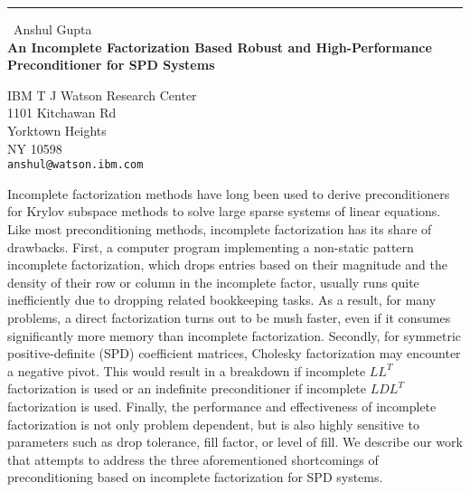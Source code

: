 \documentclass{report}
\begin{document}
\begin{center}
\rule{6in}{1pt} \
{\large Anshul Gupta \\
{\bf An Incomplete Factorization Based Robust and High-Performance Preconditioner for SPD Systems}}

IBM T J Watson Research Center \\ 1101 Kitchawan Rd \\ Yorktown Heights \\ NY 10598
\\
{\tt anshul@watson.ibm.com}\end{center}

Incomplete factorization methods have long been used to derive
preconditioners for Krylov subspace methods to solve large sparse systems
of linear equations.
Like most preconditioning methods, incomplete factorization has
its share of drawbacks. First, a computer program
implementing a non-static pattern incomplete factorization, which drops
entries based on their magnitude and the density of their row or column
in the incomplete factor, usually runs quite
inefficiently due to dropping related bookkeeping tasks. As a result,
for many problems, a direct factorization turns out to be mush faster,
even if it consumes significantly more memory than incomplete
factorization.
Secondly, for symmetric
positive-definite (SPD) coefficient matrices, Cholesky factorization
may encounter a negative pivot. This would result in a breakdown if incomplete
$LL^T$ factorization is used or an indefinite preconditioner if incomplete
$LDL^T$ factorization is used.
Finally, the performance and effectiveness of incomplete factorization
is not only problem dependent, but is
also highly sensitive to parameters such as drop tolerance,
fill factor, or level of fill.
We describe our work
that attempts to address the three aforementioned shortcomings
of preconditioning based on incomplete factorization for SPD systems.
\end{document}
